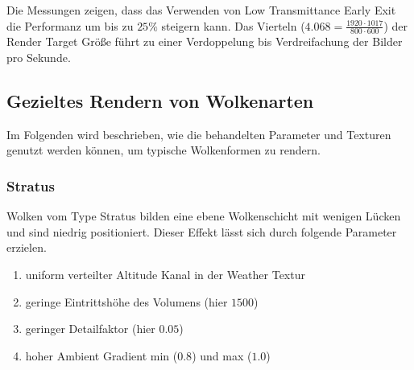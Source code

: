 \begin{table}[H]
\centering
\resizebox{\columnwidth}{!}{%
    \begin{tabular}{|c|c|c|c|c|}
        \hline
        - & 16 & 32 & 48 & 64\\
        \hline
        1 & 121 & 72 & 55 & 30\\
        \hline
        2 & 110 & 65 & 50 & 30\\
        \hline
        3 & 105 & 56 & 39 & 23\\
        \hline
        4 &  98 & 55 & 36 & 20\\
        \hline
    \end{tabular}
    
    \begin{tabular}{|c|c|c|c|c|}
        \hline
        - & 16 & 32 & 48 & 64\\
        \hline
        1 & 112 & 64 & 50 & 26\\
        \hline
        2 & 102 & 57 & 45 & 26\\
        \hline
        3 &  94 & 50 & 34 & 20\\
        \hline
        4 &  88 & 50 & 32 & 18\\
        \hline
    \end{tabular}}
\caption{800 x 600 - Mit und ohne Early Exit}
\label{tab:perf_2}
\end{table}

Die Messungen zeigen, dass das Verwenden von Low Transmittance Early Exit die Performanz um bis zu $ 25\% $ steigern kann. Das Vierteln ($ 4.068 = \frac{1920 \cdot 1017}{800 \cdot 600} $) der Render Target Größe führt zu einer Verdoppelung bis Verdreifachung der Bilder pro Sekunde.

\subsection{Gezieltes Rendern von Wolkenarten}
Im Folgenden wird beschrieben, wie die behandelten Parameter und Texturen genutzt werden können, um typische Wolkenformen zu rendern.

\subsubsection{Stratus}
Wolken vom Type Stratus bilden eine ebene Wolkenschicht mit wenigen Lücken und sind niedrig positioniert. Dieser Effekt lässt sich durch folgende Parameter erzielen.

\begin{enumerate}
    \item uniform verteilter Altitude Kanal in der Weather Textur
    \item geringe Eintrittshöhe des Volumens (hier $ 1500 $)
    \item geringer Detailfaktor (hier $ 0.05 $)
    \item hoher Ambient Gradient min ($ 0.8 $) und max ($ 1.0 $)
\end{enumerate}

